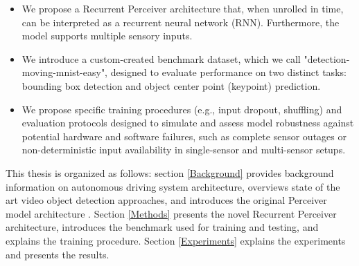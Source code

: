 \begin{itemize}
    \item We propose a Recurrent Perceiver architecture that, when unrolled in time, can be interpreted as a recurrent neural network (RNN). Furthermore, the model supports multiple sensory inputs.
    \item We introduce a custom-created benchmark dataset, which we call "detection-moving-mnist-easy", designed to evaluate performance on two distinct tasks: bounding box detection and object center point (keypoint) prediction.    
    \item We propose specific training procedures (e.g., input dropout, shuffling) and evaluation protocols designed to simulate and assess model robustness against potential hardware and software failures, such as complete sensor outages or non-deterministic input availability in single-sensor and multi-sensor setups.
\end{itemize}

This thesis is organized as follows: section \ref{Background} provides background information on autonomous driving system architecture, overviews state of the art video object detection approaches, and introduces the original Perceiver model architecture \cite{jaeglePerceiverGeneralPerception2021}. Section \ref{Methods} presents the novel Recurrent Perceiver architecture, introduces the benchmark used for training and testing, and explains the training procedure. Section \ref{Experiments} explains the experiments and presents the results.


